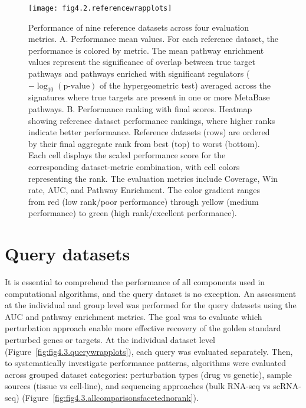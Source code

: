 \begin{figure}[htbp]
    \centering
    \texttt{[image: fig4.2.referencewrapplots]}
    \caption[Performance of nine reference datasets across four evaluation metrics.]{Performance of nine reference datasets across four evaluation metrics. A. Performance mean values. For each reference dataset, the performance is colored by metric. The mean pathway enrichment values represent the significance of overlap between true target pathways and pathways enriched with significant regulators ($-\log_{10}(\text{p-value})$ of the hypergeometric test) averaged across the signatures where true targets are present in one or more MetaBase pathways. B. Performance ranking with final scores. Heatmap showing reference dataset performance rankings, where higher ranks indicate better performance. Reference datasets (rows) are ordered by their final aggregate rank from best (top) to worst (bottom). Each cell displays the scaled performance score for the corresponding dataset-metric combination, with cell colors representing the rank. The evaluation metrics include Coverage, Win rate, \gls{AUC}, and Pathway Enrichment. The color gradient ranges from red (low rank/poor performance) through yellow (medium performance) to green (high rank/excellent performance).}
    \label{fig:fig4.2.referencewrapplots}
\end{figure}

\section{Query datasets} %
\label{sec:querydatasetsresults}

It is essential to comprehend the performance of all components used in computational algorithms, and the query dataset is no exception. An assessment at the individual and group level was performed for the query datasets using the \gls{AUC} and pathway enrichment metrics. The goal was to evaluate which perturbation approach enable more effective recovery of the golden standard perturbed genes or targets. At the individual dataset level (Figure~\ref{fig:fig4.3.querywrapplots}), each query was evaluated separately. Then, to systematically investigate performance patterns, algorithms were evaluated across grouped dataset categories: perturbation types (drug vs genetic), sample sources (tissue vs cell-line), and sequencing approaches (bulk \gls{RNA-seq} vs \gls{scRNA-seq}) (Figure~\ref{fig:fig4.3.allcomparisonsfacetednorank}).

